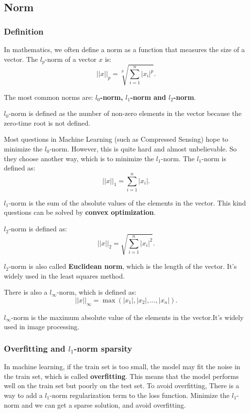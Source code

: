\documentclass[12pt]{ctexart}
\begin{document}
\subsection{\textbf{Norm}}

\subsubsection{\textbf{Definition}}

In mathematics, we often define a norm as a function that measures the size of a vector.
The $l_p$-norm of a vector $x$ is:
\[
  ||x||_p = \sqrt[p]{\sum_{i=1}^{n} |x_i|^p}.
\]

The most common norms are: \textbf{$l_0$-norm, $l_1$-norm and $l_2$-norm}.

$l_0$-norm is defined as the number of non-zero elements in the vector because the zero-time
root is not defined.

Most questions in Machine Learning (such as Compressed Sensing) hope to minimize the
$l_0$-norm. However, this is quite hard and almost unbelievable. So they choose another
way, which is to minimize the $l_1$-norm. The $l_1$-norm is defined as:
\[
  ||x||_1 = \sum_{i=1}^{n} |x_i|.
\]

$l_1$-norm is the sum of the absolute values of the elements in the vector. This kind
questions can be solved by \textbf{convex optimization}.

$l_2$-norm is defined as:
\[
  ||x||_2 = \sqrt{\sum_{i=1}^{n} |x_i|^2}.
\]

$l_2$-norm is also called \textbf{Euclidean norm}, which is the length of the vector.
It's widely used in the least squares method.

There is also a $l_{\infty}$-norm, which is defined as:
\[
  ||x||_{\infty} = \max(|x_1|, |x_2|, \ldots, |x_n|).
\]

$l_{\infty}$-norm is the maximum absolute value of the elements in the vector.It's widely
used in image processing.

\subsubsection{\textbf{Overfitting and $l_1$-norm sparsity}}

In machine learning, if the train set is too small, the model may fit the noise
in the train set, which is called \textbf{overfitting}. This means that the model
performs well on the train set but poorly on the test set. To avoid overfitting,
There is a way to add a $l_1$-norm regularization term to the loss function. Minimize
the $l_1$-norm and we can get a sparse solution, and avoid overfitting.
\end{document}
